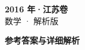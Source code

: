 \documentclass[zihao=-4, a4paper]{ctexart}
\begin{document}
\begin{center}
  {\Large\bfseries 2016 年·江苏卷}\\[4pt]
  {\large 数学 · 解析版}
\end{center}
\medskip
{}

\clearpage
{}
\begin{center}{\Large\bfseries 参考答案与详细解析}\end{center}
\medskip

\end{document}
